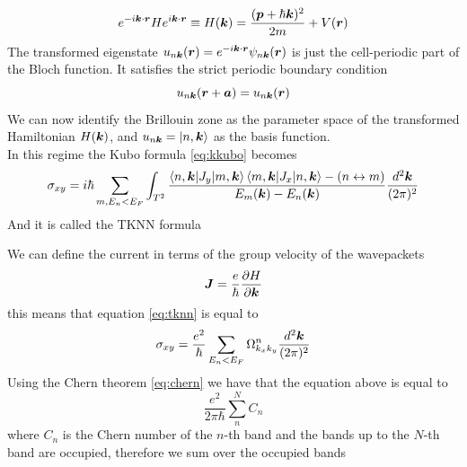 \begin{equation}
    e^{-i\boldsymbol{k}\cdot \boldsymbol{r}}He^{i\boldsymbol{k}\cdot \boldsymbol{r}}\equiv H(\boldsymbol{k})= \frac {(\boldsymbol{p}+\hbar \boldsymbol{k})^2}{2m} + V(\boldsymbol{r})
    \label{eq:k-repr}
\end{equation}
The transformed eigenstate $u_{n\boldsymbol{k}}(\boldsymbol{r})= e^{-i\boldsymbol{k}\cdot \boldsymbol{r}}\psi_{n\boldsymbol{k}}(\boldsymbol{r})$ is just the cell-periodic part of the Bloch function. It satisfies the strict periodic boundary condition 
\begin{equation}
    u_{n\boldsymbol{k}}(\boldsymbol{r}+\boldsymbol{a})=u_{n\boldsymbol{k}}(\boldsymbol{r})
\end{equation}
We can now identify the Brillouin zone as the parameter space of the transformed Hamiltonian $H(\boldsymbol{k})$, and $u_{n\boldsymbol{k}}=\ket{n,\boldsymbol{k}}$ as the basis function.\\
In this regime the Kubo formula \ref{eq:kkubo} becomes 
\begin{equation}
    \sigma_{xy}=i\hbar\sum_{m,E_n<E_F}\int_{T^2}
    \frac{
        \braket{n,\boldsymbol{k}|J_y}{m,\boldsymbol{k}}\braket{m,\boldsymbol{k}|J_x}{n,\boldsymbol{k}} - (n\leftrightarrow m)
    }
    {
        E_m(\boldsymbol{k})-E_n(\boldsymbol{k})
    }
    \frac{d^2\boldsymbol{k}}{(2\pi)^2}
    \label{eq:tknn}
\end{equation}
And it is called the TKNN formula \cite{thouless1982quantized}

We can define the current in terms of the group velocity of the wavepackets
\begin{equation}
    \boldsymbol{J}=\frac e\hbar \frac{\partial H}{\partial \boldsymbol{k}}
\end{equation}
this means that equation \ref{eq:tknn} is equal to
\begin{equation}
    \sigma_{xy}=\frac{e^2}\hbar \sum_{E_n<E_F}\Omega^n_{k_xk_y}\frac {d^2\boldsymbol{k}}{(2\pi)^2}
    \label{eq:fermi-cond}
\end{equation}
Using the Chern theorem \ref{eq:chern} we have that the equation above is equal to 
\begin{equation}
    \frac{e^2}{2\pi\hbar}\sum_n^N C_n
\end{equation}
where $C_n$ is the Chern number of the $n$-th band and the bands up to the $N$-th band are occupied, therefore we sum over the occupied bands



















